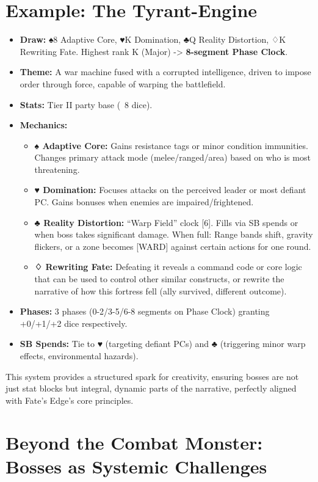 \section{Example: The Tyrant-Engine}

\begin{itemize}
    \item \textbf{Draw:} ♠8 Adaptive Core, ♥K Domination, ♣Q Reality Distortion, ♢K Rewriting Fate. Highest rank K (Major) -> \textbf{8-segment Phase Clock}.
    \item \textbf{Theme:} A war machine fused with a corrupted intelligence, driven to impose order through force, capable of warping the battlefield.
    \item \textbf{Stats:} Tier II party base (~8 dice).
    \item \textbf{Mechanics:}
    \begin{itemize}
        \item \textbf{♠ Adaptive Core:} Gains resistance tags or minor condition immunities. Changes primary attack mode (melee/ranged/area) based on who is most threatening.
        \item \textbf{♥ Domination:} Focuses attacks on the perceived leader or most defiant PC. Gains bonuses when enemies are impaired/frightened.
        \item \textbf{♣ Reality Distortion:} ``Warp Field'' clock [6]. Fills via SB spends or when boss takes significant damage. When full: Range bands shift, gravity flickers, or a zone becomes [WARD] against certain actions for one round.
        \item \textbf{♢ Rewriting Fate:} Defeating it reveals a command code or core logic that can be used to control other similar constructs, or rewrite the narrative of how this fortress fell (ally survived, different outcome).
    \end{itemize}
    \item \textbf{Phases:} 3 phases (0-2/3-5/6-8 segments on Phase Clock) granting +0/+1/+2 dice respectively.
    \item \textbf{SB Spends:} Tie to ♥ (targeting defiant PCs) and ♣ (triggering minor warp effects, environmental hazards).
\end{itemize}

This system provides a structured spark for creativity, ensuring bosses are not just stat blocks but integral, dynamic parts of the narrative, perfectly aligned with Fate's Edge's core principles.

\section{Beyond the Combat Monster: Bosses as Systemic Challenges}
\label{sec:noncombat-bosses}

